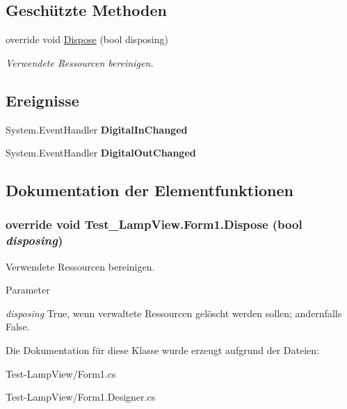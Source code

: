 \subsection*{Geschützte Methoden}
\begin{DoxyCompactItemize}
\item 
override void \hyperlink{class_test___lamp_view_1_1_form1_a450d572ace13815beff4ac88c22c8d6c}{Dispose} (bool disposing)
\begin{DoxyCompactList}\small\item\em Verwendete Ressourcen bereinigen. \item\end{DoxyCompactList}\end{DoxyCompactItemize}
\subsection*{Ereignisse}
\begin{DoxyCompactItemize}
\item 
\hypertarget{class_test___lamp_view_1_1_form1_a8a2400bdd066b2b481cee52a9b0e2893}{
System.EventHandler {\bfseries DigitalInChanged}}
\label{class_test___lamp_view_1_1_form1_a8a2400bdd066b2b481cee52a9b0e2893}

\item 
\hypertarget{class_test___lamp_view_1_1_form1_a78e050394675cf1d7c55f80243eaae03}{
System.EventHandler {\bfseries DigitalOutChanged}}
\label{class_test___lamp_view_1_1_form1_a78e050394675cf1d7c55f80243eaae03}

\end{DoxyCompactItemize}


\subsection{Dokumentation der Elementfunktionen}
\hypertarget{class_test___lamp_view_1_1_form1_a450d572ace13815beff4ac88c22c8d6c}{
\subsubsection[{Dispose}]{\setlength{\rightskip}{0pt plus 5cm}override void Test\_\-LampView.Form1.Dispose (bool {\em disposing})}}
\label{class_test___lamp_view_1_1_form1_a450d572ace13815beff4ac88c22c8d6c}


Verwendete Ressourcen bereinigen. 


\begin{DoxyParams}{Parameter}
\item[{\em disposing}]True, wenn verwaltete Ressourcen gelöscht werden sollen; andernfalls False.\end{DoxyParams}


Die Dokumentation für diese Klasse wurde erzeugt aufgrund der Dateien:\begin{DoxyCompactItemize}
\item 
Test-\/LampView/Form1.cs\item 
Test-\/LampView/Form1.Designer.cs\end{DoxyCompactItemize}
